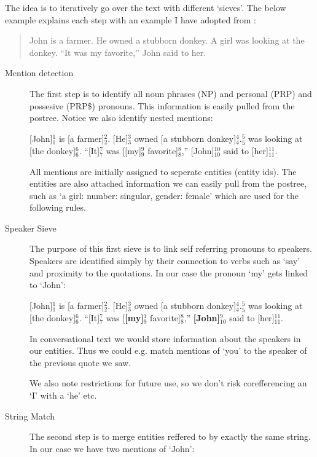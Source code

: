\documentclass[12pt]{article}
\begin{document}
The idea is to iteratively go over the text with different `sieves'. The below example explains each step with an example I have adopted from \cite{lee2013deterministic}:

\begin{quotation}
John is a farmer. He owned a stubborn donkey.
A girl was looking at the donkey.
``It was my favorite,'' John said to her.
\end{quotation}

\begin{description}
\item[Mention detection]
The first step is to identify all noun phrases (NP) and personal (PRP) and possesive (PRP\$) pronouns. This information is easily pulled from the postree. Notice we also identify nested mentions:

[John]$_1^1$ is [a farmer]$_2^2$. [He]$_3^3$ owned [a stubborn donkey]$_4^4$.\newline
[A girl]$_5^5$ was looking at [the donkey]$_6^6$.\newline
``[It]$_7^7$ was [[my]$_9^9$ favorite]$_8^8$,'' [John]$_{10}^{10}$ said to [her]$_{11}^{11}$.

All mentions are initially assigned to seperate entities (entity ids). The entities are also attached information we can easily pull from the postree, such as `a girl: {number: singular, gender: female}' which are used for the following rules.
\item[Speaker Sieve]
The purpose of this first sieve is to link self referring pronouns to speakers. Speakers are identified simply by their connection to verbs such as `say' and proximity to the quotations. In our case the pronoun `my' gets linked to `John':

[John]$_1^1$ is [a farmer]$_2^2$. [He]$_3^3$ owned [a stubborn donkey]$_4^4$.\newline
[A girl]$_5^5$ was looking at [the donkey]$_6^6$.\newline
``[It]$_7^7$ was [\textbf{[my]$_9^1$} favorite]$_8^8$,'' \textbf{[John]$_{10}^{9}$} said to [her]$_{11}^{11}$.

In conversational text we would store information about the speakers in our entities. Thus we could e.g. match mentions of `you' to the speaker of the previous quote we saw.

We also note restrictions for future use, so we don't risk corefferencing an `I' with a `he' etc.
\item[String Match]
The second step is to merge entities reffered to by exactly the same string. In our case we have two mentions of `John':


\end{description}
\end{document}
